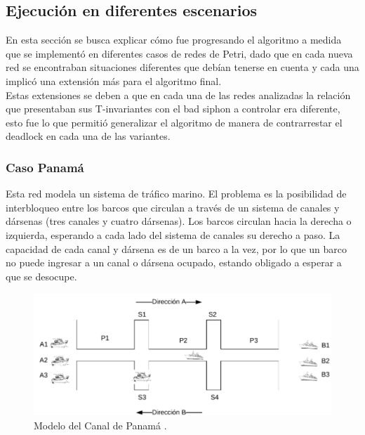 \subsection{Ejecución en diferentes escenarios}
En esta sección se busca explicar cómo fue progresando el algoritmo a medida que se implementó en diferentes casos de redes de Petri, dado que en cada nueva red se encontraban situaciones diferentes que debían tenerse en cuenta y cada una implicó una extensión más para el algoritmo final. \\
Estas extensiones se deben a que en cada una de las redes analizadas la relación que presentaban sus T-invariantes con el bad siphon a controlar era diferente, esto fue lo que permitió generalizar el algoritmo de manera de contrarrestar el deadlock en cada una de las variantes.

\subsubsection{Caso Panamá}
Esta red modela un sistema de tráfico marino. El problema es la posibilidad de interbloqueo entre los barcos que circulan a través de un sistema de canales y dársenas (tres canales y cuatro dársenas). Los barcos circulan hacia la derecha o izquierda, esperando a cada lado del sistema de canales su derecho a paso. 
La capacidad de cada canal y dársena es de un barco a la vez, por lo que un barco no puede ingresar a un canal o dársena ocupado, estando obligado a esperar a que se desocupe.

\begin{figure}[H]
    \centering
    \includegraphics[width=\textwidth]{Figures/algoritmo3/panamacanal.png}
    \caption[Modelo del Canal de Panamá.]{Modelo del Canal de Panamá \footnotemark.}
    \label{fig:fig3.11}
 \end{figure} 

